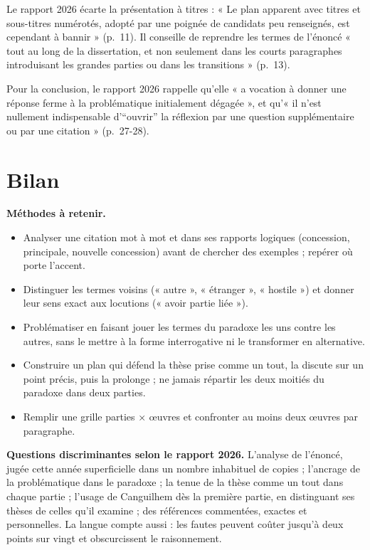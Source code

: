 \documentclass[11pt,a4paper]{article}
\providecommand{\tightlist}{\setlength{\itemsep}{0pt}\setlength{\parskip}{0pt}}
\begin{document}
\begin{jury}

Le rapport 2026 écarte la présentation à titres : « Le plan apparent avec titres et sous-titres numérotés, adopté par une poignée de candidats peu renseignés, est cependant à bannir » (p.~11). Il conseille de reprendre les termes de l'énoncé « tout au long de la dissertation, et non seulement dans les courts paragraphes introduisant les grandes parties ou dans les transitions » (p.~13).

\end{jury}

\begin{jury}

Pour la conclusion, le rapport 2026 rappelle qu'elle « a vocation à donner une réponse ferme à la problématique initialement dégagée », et qu'« il n'est nullement indispensable d'``ouvrir'' la réflexion par une question supplémentaire ou par une citation » (p.~27-28).

\end{jury}

\hypertarget{bilan}{%
\section{Bilan}\label{bilan}}

\textbf{Méthodes à retenir.}

\begin{itemize}
\tightlist
\item
  Analyser une citation mot à mot et dans ses rapports logiques (concession, principale, nouvelle concession) avant de chercher des exemples ; repérer où porte l'accent.
\item
  Distinguer les termes voisins (« autre », « étranger », « hostile ») et donner leur sens exact aux locutions (« avoir partie liée »).
\item
  Problématiser en faisant jouer les termes du paradoxe les uns contre les autres, sans le mettre à la forme interrogative ni le transformer en alternative.
\item
  Construire un plan qui défend la thèse prise comme un tout, la discute sur un point précis, puis la prolonge ; ne jamais répartir les deux moitiés du paradoxe dans deux parties.
\item
  Remplir une grille parties × œuvres et confronter au moins deux œuvres par paragraphe.
\end{itemize}

\textbf{Questions discriminantes selon le rapport 2026.} L'analyse de l'énoncé, jugée cette année superficielle dans un nombre inhabituel de copies ; l'ancrage de la problématique dans le paradoxe ; la tenue de la thèse comme un tout dans chaque partie ; l'usage de Canguilhem dès la première partie, en distinguant ses thèses de celles qu'il examine ; des références commentées, exactes et personnelles. La langue compte aussi : les fautes peuvent coûter jusqu'à deux points sur vingt et obscurcissent le raisonnement.
\end{document}
